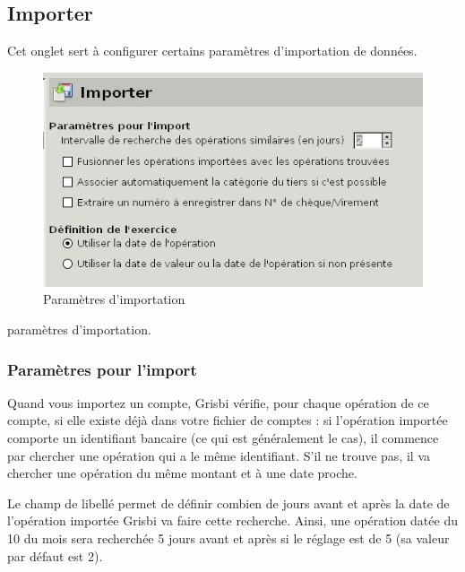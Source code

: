 \subsection{Importer\label{setup-general-import}}

Cet onglet sert à configurer certains \ifIllustration paramètres d'importation de données.
\begin{figure}[htbp]
\begin{center}
\includegraphics[scale=0.5]{image/screenshot/setup_import}
\end{center}
\caption{Paramètres d'importation}
\label{setup-import-img}
\end{figure}
\else paramètres d'importation.
\fi


\subsubsection{Paramètres pour l'import\label{setup-general-import-parameters}}

Quand vous importez un compte, Grisbi vérifie, pour chaque opération de ce compte, si elle existe déjà dans votre fichier de comptes : si l'opération importée comporte un identifiant bancaire (ce qui est généralement le cas), il commence par chercher une opération qui a le même identifiant. S'il ne trouve pas, il va chercher une opération du même montant et à une date proche.

Le champ de libellé  permet de définir combien de jours avant et après la date de l'opération importée Grisbi va faire cette recherche. Ainsi, une opération datée du 10 du mois sera recherchée 5 jours avant et après si le réglage est de 5 (sa valeur par défaut est 2).

